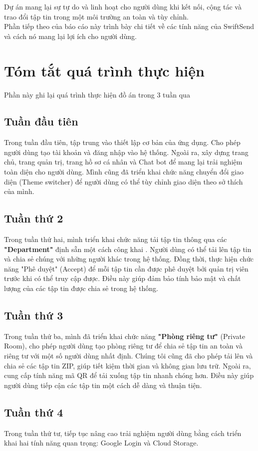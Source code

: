 \documentclass[paper=a4wide, fontsize=12pt]{scrartcl}	 %
\begin{document}
Dự án mang lại sự tự do và linh hoạt cho người dùng khi kết nối, cộng tác và trao đổi tập tin trong một môi trường an toàn và tùy chỉnh. \\

Phần tiếp theo của báo cáo này trình bày chi tiết về các tính năng của SwiftSend và cách nó mang lại lợi ích cho người dùng.

\section{Tóm tắt quá trình thực hiện}
Phần này ghi lại quá trình thực hiện đồ án trong 3 tuần qua
\subsection{Tuần đầu tiên}
Trong tuần đầu tiên, tập trung vào thiết lập cơ bản của ứng dụng. Cho phép người dùng tạo tài khoản và đăng nhập vào hệ thống. Ngoài ra, xây dựng trang chủ, trang quản trị, trang hồ sơ cá nhân và Chat bot để mang lại trải nghiệm toàn diện cho người dùng. Mình cũng đã triển khai chức năng chuyển đổi giao diện (Theme switcher) để người dùng có thể tùy chỉnh giao diện theo sở thích của mình.
\subsection{Tuần thứ 2}
Trong tuần thứ hai, mình triển khai chức năng tải tập tin thông qua các \textbf{"Department"} định sẵn một cách công khai . Người dùng có thể tải lên tập tin và chia sẻ chúng với những người khác trong hệ thống. Đồng thời, thực hiện chức năng "Phê duyệt" (Accept) để mỗi tập tin cần được phê duyệt bởi quản trị viên trước khi có thể truy cập được. Điều này giúp đảm bảo tính bảo mật và chất lượng của các tập tin được chia sẻ trong hệ thống.
\subsection{Tuần thứ 3}
Trong tuần thứ ba, mình đã triển khai chức năng \textbf{"Phòng riêng tư"} (Private Room), cho phép người dùng tạo phòng riêng tư để chia sẻ tập tin an toàn và riêng tư với một số người dùng nhất định. Chúng tôi cũng đã cho phép tải lên và chia sẻ các tập tin ZIP, giúp tiết kiệm thời gian và không gian lưu trữ. Ngoài ra, cung cấp tính năng mã QR để tải xuống tập tin nhanh chóng hơn. Điều này giúp người dùng tiếp cận các tập tin một cách dễ dàng và thuận tiện.
\subsection{Tuần thứ 4}
Trong tuần thứ tư, tiếp tục nâng cao trải nghiệm người dùng bằng cách triển khai hai tính năng quan trọng: Google Login và Cloud Storage.
\end{document}
